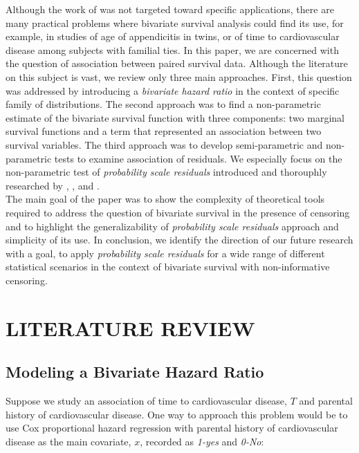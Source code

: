 \documentclass[]{article}
\begin{document}
Although the work of \cite{basu1971bivariate} was not targeted toward specific applications, there are many practical problems where bivariate survival analysis could find its use, for example, in studies of age of appendicitis in twins, or of time to cardiovascular disease among subjects with familial ties. In this paper, we are concerned with the question of association between paired survival data. Although the literature on this subject is vast, we review only three main approaches. First, this question was addressed by introducing a \emph{bivariate hazard ratio} in the context of specific family of distributions. The second approach was to find a non-parametric estimate of the bivariate survival function with three components: two marginal survival functions and a term that represented an association between two survival variables. The third approach was to develop semi-parametric and non-parametric tests to examine association of residuals. We especially focus on the non-parametric test of \emph{probability scale residuals} introduced and thorouphly researched by \cite{li2012new}, \cite{lui2015covariate}, and \cite{shepherd2016probability}.\\
The main goal of the paper was to show the complexity of theoretical tools required to address the question of bivariate survival in the presence of censoring and to highlight the generalizability of \emph{probability scale residuals} approach and simplicity of its use. In conclusion, we identify the direction of our future research with a goal, to apply \emph{probability scale residuals} for a wide range of different statistical scenarios in the context of bivariate survival with non-informative censoring.

\section{LITERATURE REVIEW}

\subsection{Modeling a Bivariate Hazard Ratio}

Suppose we study an association of time to cardiovascular disease, $T$ and parental history of cardiovascular disease. One way to approach this problem would be to use Cox proportional hazard regression with parental history of cardiovascular disease as the main covariate, $x$, recorded as \emph{1-yes} and \emph{0-No}:
\end{document}
